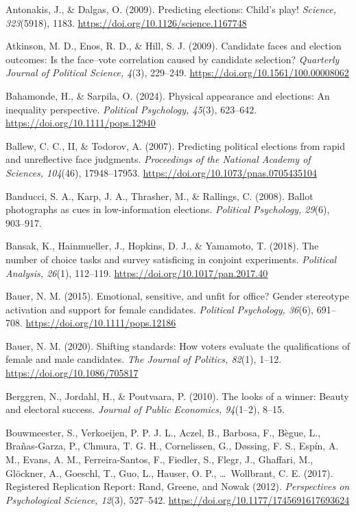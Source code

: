 \documentclass[11pt]{article}\usepackage[]{graphicx}\usepackage[]{xcolor}
\begin{document}
{\begin{list}{}{%
  \setlength{\leftmargin}{1.5em}%
  \setlength{\itemindent}{-1.5em}%
  \setlength{\itemsep}{0pt}%
  \setlength{\parsep}{0pt}%
  \setlength{\topsep}{1pt}%
}
\item Antonakis, J., \& Dalgas, O. (2009). Predicting elections: Child's play! \emph{Science, 323}(5918), 1183. \url{https://doi.org/10.1126/science.1167748}

\item Atkinson, M. D., Enos, R. D., \& Hill, S. J. (2009). Candidate faces and election outcomes: Is the face--vote correlation caused by candidate selection? \emph{Quarterly Journal of Political Science, 4}(3), 229--249. \url{https://doi.org/10.1561/100.00008062}

\item Bahamonde, H., \& Sarpila, O. (2024). Physical appearance and elections: An inequality perspective. \emph{Political Psychology, 45}(3), 623--642. \url{https://doi.org/10.1111/pops.12940}

\item Ballew, C. C., II, \& Todorov, A. (2007). Predicting political elections from rapid and unreflective face judgments. \emph{Proceedings of the National Academy of Sciences, 104}(46), 17948--17953. \url{https://doi.org/10.1073/pnas.0705435104}

\item Banducci, S. A., Karp, J. A., Thrasher, M., \& Rallings, C. (2008). Ballot photographs as cues in low-information elections. \emph{Political Psychology, 29}(6), 903--917.

\item Bansak, K., Hainmueller, J., Hopkins, D. J., \& Yamamoto, T. (2018). The number of choice tasks and survey satisficing in conjoint experiments. \emph{Political Analysis, 26}(1), 112--119. \url{https://doi.org/10.1017/pan.2017.40}

\item Bauer, N. M. (2015). Emotional, sensitive, and unfit for office? Gender stereotype activation and support for female candidates. \emph{Political Psychology, 36}(6), 691--708. \url{https://doi.org/10.1111/pops.12186}

\item Bauer, N. M. (2020). Shifting standards: How voters evaluate the qualifications of female and male candidates. \emph{The Journal of Politics, 82}(1), 1--12. \url{https://doi.org/10.1086/705817}

\item Berggren, N., Jordahl, H., \& Poutvaara, P. (2010). The looks of a winner: Beauty and electoral success. \emph{Journal of Public Economics, 94}(1--2), 8--15.

\item Bouwmeester, S., Verkoeijen, P. P. J. L., Aczel, B., Barbosa, F., B\`egue, L., Bra\~nas-Garza, P., Chmura, T. G. H., Cornelissen, G., D{\o}ssing, F. S., Esp\'in, A. M., Evans, A. M., Ferreira-Santos, F., Fiedler, S., Flegr, J., Ghaffari, M., Gl\"ockner, A., Goeschl, T., Guo, L., Hauser, O. P., \ldots\ Wollbrant, C. E. (2017). Registered Replication Report: Rand, Greene, and Nowak (2012). \emph{Perspectives on Psychological Science, 12}(3), 527--542. \url{https://doi.org/10.1177/1745691617693624}


\end{list}}
\end{document}
